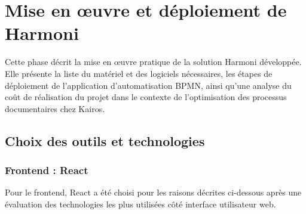 \chapter{Mise en œuvre et déploiement de Harmoni}
\label{ch:mise_oeuvre_harmoni}

Cette phase décrit la mise en œuvre pratique de la solution Harmoni développée. Elle présente la liste du matériel et des logiciels nécessaires, les étapes de déploiement de l'application d'automatisation BPMN, ainsi qu'une analyse du coût de réalisation du projet dans le contexte de l'optimisation des processus documentaires chez Kairos.

\section{Choix des outils et technologies}

\subsection{Frontend : React}

Pour le frontend, React a été choisi pour les raisons décrites ci-dessous après une évaluation des technologies les plus utilisées côté interface utilisateur web.

\begin{table}[H]
    \centering
    \caption{Comparaison des technologies frontend}
    \label{tab:comparatif-frontend}
\end{table}


